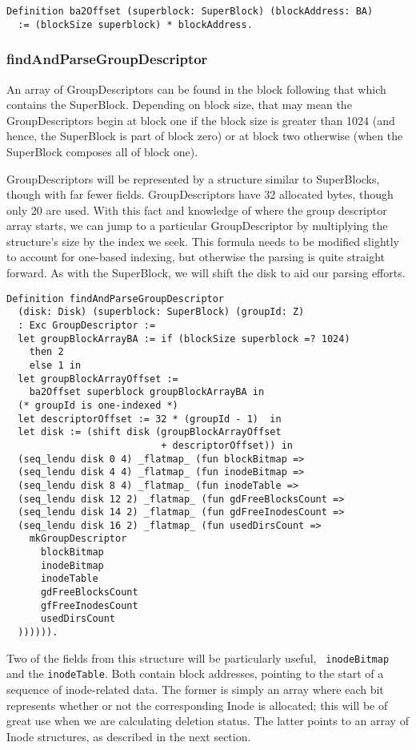 \documentclass[nocopyrightspace]{sigplanconf}
\begin{document}
\begin{lstlisting}
Definition ba2Offset (superblock: SuperBlock) (blockAddress: BA)
  := (blockSize superblock) * blockAddress.
\end{lstlisting}

\subsubsection{findAndParseGroupDescriptor}
An array of GroupDescriptors can be found in the block following that which
contains the SuperBlock. Depending on block size, that may mean the
GroupDescriptors begin at block one if the block size is greater than 1024
(and hence, the SuperBlock is part of block zero) or at block two otherwise
(when the SuperBlock composes all of block one). 

GroupDescriptors will be represented by a structure similar to SuperBlocks,
though with far fewer fields. GroupDescriptors have 32 allocated bytes, though
only 20 are used. With this fact and knowledge of where the group descriptor
array starts, we can jump to a particular GroupDescriptor by multiplying the
structure's size by the index we seek. This formula needs to be modified
slightly to account for one-based indexing, but otherwise the parsing is quite
straight forward. As with the SuperBlock, we will shift the disk to aid our
parsing efforts. 

\begin{lstlisting}
Definition findAndParseGroupDescriptor 
  (disk: Disk) (superblock: SuperBlock) (groupId: Z)
  : Exc GroupDescriptor :=
  let groupBlockArrayBA := if (blockSize superblock =? 1024)
    then 2
    else 1 in
  let groupBlockArrayOffset := 
    ba2Offset superblock groupBlockArrayBA in
  (* groupId is one-indexed *)
  let descriptorOffset := 32 * (groupId - 1)  in
  let disk := (shift disk (groupBlockArrayOffset 
                           + descriptorOffset)) in
  (seq_lendu disk 0 4) _flatmap_ (fun blockBitmap =>
  (seq_lendu disk 4 4) _flatmap_ (fun inodeBitmap =>
  (seq_lendu disk 8 4) _flatmap_ (fun inodeTable =>
  (seq_lendu disk 12 2) _flatmap_ (fun gdFreeBlocksCount =>
  (seq_lendu disk 14 2) _flatmap_ (fun gdFreeInodesCount =>
  (seq_lendu disk 16 2) _flatmap_ (fun usedDirsCount =>
    mkGroupDescriptor
      blockBitmap
      inodeBitmap
      inodeTable
      gdFreeBlocksCount
      gfFreeInodesCount
      usedDirsCount
  )))))).
\end{lstlisting}

Two of the fields from this structure will be particularly useful, {\tt
inodeBitmap} and the {\tt inodeTable}. Both contain block addresses, pointing
to the start of a sequence of inode-related data. The former is simply an
array where each bit represents whether or not the corresponding Inode is
allocated; this will be of great use when we are calculating deletion status.
The latter points to an array of Inode structures, as described in the next
section.
\end{document}
